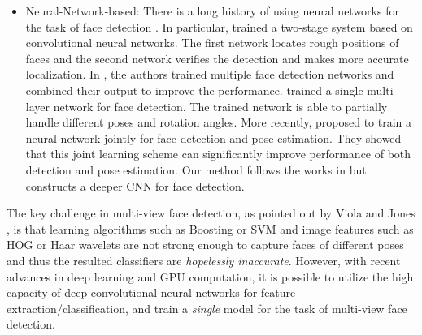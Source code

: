\documentclass{sig-alternate-2013}
\begin{document}
\begin{itemize}
\item{Neural-Network-based: There is a long history of using neural networks for the task of face detection \cite{Vaillant94, Vaillant93, Rowley98, Garcia04, Garcia03, Garcia02, embeddedCFF, openMPCFF, Osadchy04, Osadchy07}. In particular, \cite{Vaillant94} trained a two-stage system based on convolutional neural networks. The first network locates rough positions of faces and the second network verifies the detection and makes more accurate localization. In \cite{Rowley98}, the authors trained multiple face detection networks and combined their output to improve the performance. \cite{Garcia04} trained a single multi-layer network for face detection. The trained network is able to partially handle different poses and rotation angles. More recently, \cite{Osadchy07} proposed to train a neural network jointly for face detection and pose estimation. They showed that this joint learning scheme can significantly improve  performance of both detection and pose estimation. Our method follows the works in \cite{Garcia04, Osadchy07} but  constructs a deeper CNN for face detection.} 


\end{itemize} 

The key challenge in multi-view face detection, as pointed out by Viola and Jones \cite{VJ_multi_view}, is that learning algorithms such as Boosting or SVM and image features such as HOG or  Haar wavelets are not strong enough to capture faces of different poses and thus the resulted classifiers are \textit{hopelessly inaccurate}. However, with recent advances in deep learning and GPU computation, it is possible to utilize the high capacity of deep convolutional neural networks for feature extraction/classification, and train a \textit{single} model for the task of multi-view face detection.
\end{document}
